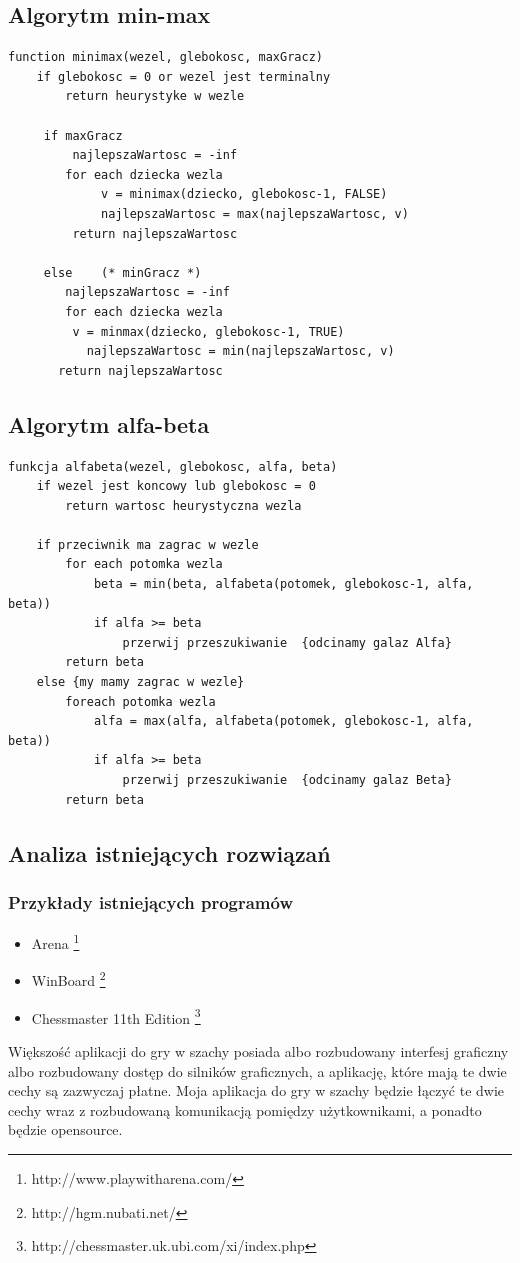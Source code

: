 \documentclass[12pt]{article}
\begin{document}
\subsection{Algorytm min-max}
\begin{lstlisting}
function minimax(wezel, glebokosc, maxGracz)
    if glebokosc = 0 or wezel jest terminalny
        return heurystyke w wezle

     if maxGracz
         najlepszaWartosc = -inf
        for each dziecka wezla
             v = minimax(dziecko, glebokosc-1, FALSE)
             najlepszaWartosc = max(najlepszaWartosc, v)
         return najlepszaWartosc

     else    (* minGracz *)
        najlepszaWartosc = -inf
        for each dziecka wezla
         v = minmax(dziecko, glebokosc-1, TRUE)
           najlepszaWartosc = min(najlepszaWartosc, v)
       return najlepszaWartosc

\end{lstlisting}

\subsection{Algorytm alfa-beta}
\begin{lstlisting}
funkcja alfabeta(wezel, glebokosc, alfa, beta)
    if wezel jest koncowy lub glebokosc = 0
        return wartosc heurystyczna wezla
        
    if przeciwnik ma zagrac w wezle
        for each potomka wezla
            beta = min(beta, alfabeta(potomek, glebokosc-1, alfa, beta))
            if alfa >= beta
                przerwij przeszukiwanie  {odcinamy galaz Alfa}
        return beta
    else {my mamy zagrac w wezle}
        foreach potomka wezla
            alfa = max(alfa, alfabeta(potomek, glebokosc-1, alfa, beta))
            if alfa >= beta
                przerwij przeszukiwanie  {odcinamy galaz Beta}
        return beta

\end{lstlisting}

\subsection{Analiza istniejących rozwiązań}
\subsubsection{Przykłady istniejących programów}
\begin{itemize}
\item Arena \footnote{http://www.playwitharena.com/}
\item WinBoard \footnote{http://hgm.nubati.net/}
\item Chessmaster 11th Edition \footnote{http://chessmaster.uk.ubi.com/xi/index.php}
\end{itemize}

Większość aplikacji do gry w szachy posiada albo rozbudowany interfesj graficzny albo rozbudowany dostęp do silników graficznych, a aplikację, które mają te dwie cechy są zazwyczaj płatne. Moja aplikacja do gry w szachy będzie łączyć te dwie cechy wraz z rozbudowaną komunikacją pomiędzy użytkownikami, a ponadto będzie opensource.
\end{document}
